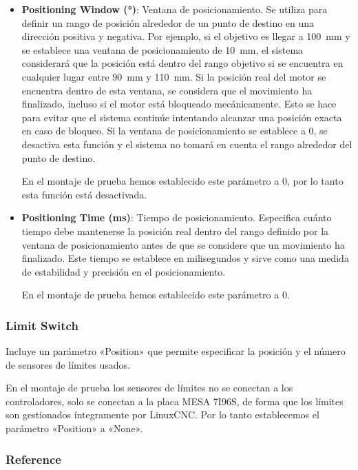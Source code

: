 \documentclass[english,spanish,a4paper,11pt]{article}
\begin{document}
\begin{itemize}
    \item \textbf{Positioning Window (\unit{\degree})}: Ventana de posicionamiento. Se utiliza para definir un rango de posición alrededor de un punto de destino en una dirección positiva y negativa. Por ejemplo, si el objetivo es llegar a \qty{100}{\mm} y se establece una ventana de posicionamiento de \qty{10}{\mm}, el sistema considerará que la posición está dentro del rango objetivo si se encuentra en cualquier lugar entre \qty{90}{\mm} y \qty{110}{\mm}. Si la posición real del motor se encuentra dentro de esta ventana, se considera que el movimiento ha finalizado, incluso si el motor está bloqueado mecánicamente. Esto se hace para evitar que el sistema continúe intentando alcanzar una posición exacta en caso de bloqueo. Si la ventana de posicionamiento se establece a 0, se desactiva esta función y el sistema no tomará en cuenta el rango alrededor del punto de destino.

    En el montaje de prueba hemos establecido este parámetro a 0, por lo tanto esta función está desactivada.

    \item \textbf{Positioning Time (\unit{\ms})}: Tiempo de posicionamiento. Especifica cuánto tiempo debe mantenerse la posición real dentro del rango definido por la ventana de posicionamiento antes de que se considere que un movimiento ha finalizado. Este tiempo se establece en milisegundos y sirve como una medida de estabilidad y precisión en el posicionamiento.

    En el montaje de prueba hemos establecido este parámetro a 0.
\end{itemize}


\subsubsection{Limit Switch}
\label{sec:limit_switch}
Incluye un parámetro «Position» que permite especificar la posición y el número de sensores de límites usados. 

En el montaje de prueba los sensores de límites no se conectan a los controladores, solo se conectan a la placa MESA 7I96S, de forma que los límites son gestionados íntegramente por LinuxCNC. Por lo tanto establecemos el parámetro «Position» a «None».


\subsubsection{Reference}
\end{document}
